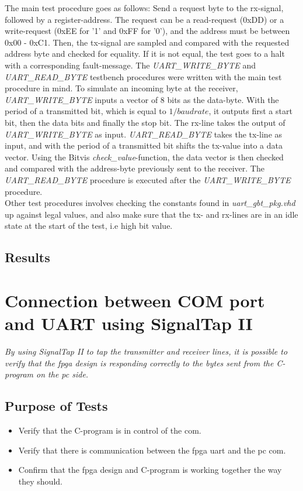 \documentclass[main.tex]{subfiles}
\begin{document}
The main test procedure goes as follows: Send a request byte to the rx-signal, followed by a register-address. The request can be a read-request (0xDD) or a write-request (0xEE for '1' and 0xFF for '0'), and the address must be between 0x00 - 0xC1. Then, the tx-signal are sampled and compared with the requested address byte and checked for equality. If it is not equal, the test goes to a halt with a corresponding fault-message. The \textit{UART\_WRITE\_BYTE} and \textit{UART\_READ\_BYTE} testbench procedures were written with the main test procedure in mind. To simulate an incoming byte at the receiver, \textit{UART\_WRITE\_BYTE} inputs a vector of 8 bits as the data-byte. With the period of a transmitted bit, which is equal to $1/baud rate$, it outputs first a start bit, then the data bits and finally the stop bit. The rx-line takes the output of \textit{UART\_WRITE\_BYTE} as input. \textit{UART\_READ\_BYTE} takes the tx-line as input, and with the period of a transmitted bit shifts the tx-value into a data vector. Using the Bitvis \textit{check\_value}-function, the data vector is then checked and compared with the address-byte previously sent to the receiver. The \textit{UART\_READ\_BYTE} procedure is executed after the \textit{UART\_WRITE\_BYTE} procedure. \\

Other test procedures involves checking the constants found in \textit{uart\_gbt\_pkg.vhd} up against legal values, and also make sure that the tx- and rx-lines are in an idle state at the start of the test, i.e high bit value.

\subsection{Results}

\section{Connection between COM port and UART using SignalTap II}

\textit{By using SignalTap II to tap the transmitter and receiver lines, it is possible to verify that the \gls{fpga} design is responding correctly to the bytes sent from the C-program on the \gls{pc} side.} 

\subsection{Purpose of Tests}
\begin{itemize}\setlength{\itemsep}{10pt}
\item Verify that the C-program is in control of the \gls{com}.
\item Verify that there is communication between the \gls{fpga} \gls{uart} and the \gls{pc} \gls{com}.
\item Confirm that the \gls{fpga} design and C-program is working together the way they should.
\end{itemize}
\end{document}
